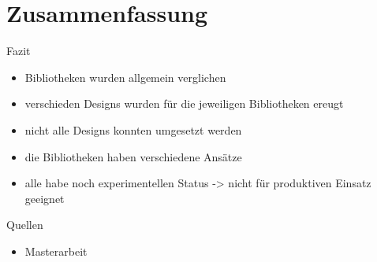 \documentclass[a4paper, fontsize=11pt]{beamer}
\begin{document}
\section{Zusammenfassung}
\begin{frame}{Fazit}
    \begin{itemize}
        \item Bibliotheken wurden allgemein verglichen
        \item verschieden Designs wurden für die jeweiligen Bibliotheken ereugt
        \item nicht alle Designs konnten umgesetzt werden
        \item die Bibliotheken haben verschiedene Ansätze
        \item alle habe noch experimentellen Status -> nicht für produktiven
            Einsatz geeignet
    \end{itemize}
\end{frame}

\begin{frame}{Quellen}
    \begin{itemize}
        \item Masterarbeit
    \end{itemize}
\end{frame}
\end{document}
